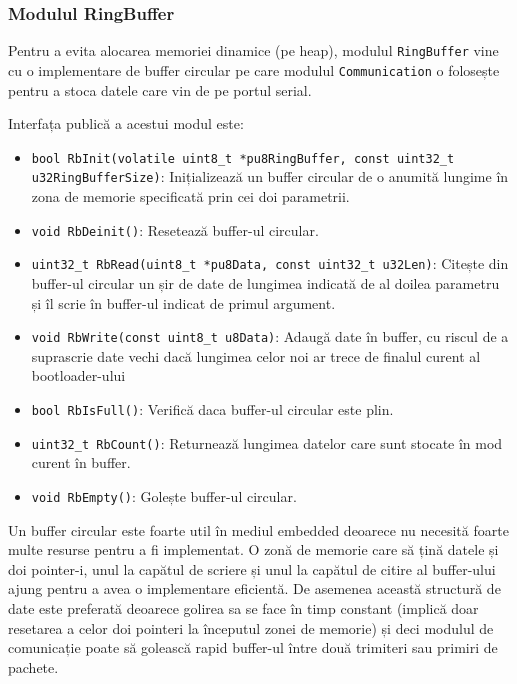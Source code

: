 \documentclass[12pt,a4paper,titlepage]{report}
\begin{document}
\subsubsection{Modulul RingBuffer}

Pentru a evita alocarea memoriei dinamice (pe heap), modulul \texttt{RingBuffer} vine cu o implementare de buffer circular pe care modulul \texttt{Communication} o folosește pentru a stoca datele care vin de pe portul serial.

Interfața publică a acestui modul este:
\begin{itemize}
\item \texttt{bool RbInit(volatile uint8\_t *pu8RingBuffer, const uint32\_t u32RingBufferSize)}: Inițializează un buffer circular de o anumită lungime în zona de memorie specificată prin cei doi parametrii.
\item \texttt{void RbDeinit()}: Resetează buffer-ul circular.
\item \texttt{uint32\_t RbRead(uint8\_t *pu8Data, const uint32\_t u32Len)}: Citește din buffer-ul circular un șir de date de lungimea indicată de al doilea parametru și îl scrie în buffer-ul indicat de primul argument.
\item \texttt{void RbWrite(const uint8\_t u8Data)}: Adaugă date în buffer, cu riscul de a suprascrie date vechi dacă lungimea celor noi ar trece de finalul curent al bootloader-ului
\item \texttt{bool RbIsFull()}: Verifică daca buffer-ul circular este plin.
\item \texttt{uint32\_t RbCount()}: Returnează lungimea datelor care sunt stocate în mod curent în buffer.
\item \texttt{void RbEmpty()}: Golește buffer-ul circular.
\end{itemize}

Un buffer circular este foarte util în mediul embedded deoarece nu necesită foarte multe resurse pentru a fi implementat. O zonă de memorie care să țină datele și doi pointer-i, unul la capătul de scriere și unul la capătul de citire al buffer-ului ajung pentru a avea o implementare eficientă. De asemenea această structură de date este preferată deoarece golirea sa se face în timp constant (implică doar resetarea a celor doi pointeri la începutul zonei de memorie) și deci modulul de comunicație poate să golească rapid buffer-ul între două trimiteri sau primiri de pachete.
\end{document}
